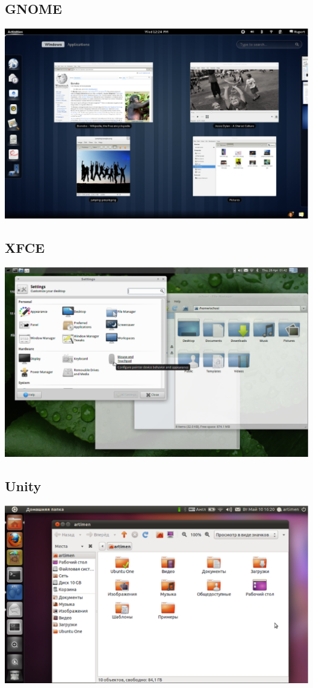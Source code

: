 \subsection{GNOME}
\includegraphics[scale=0.5]{base/Software/Gnome.eps}
\subsection{XFCE}
\includegraphics[scale=0.28]{base/Software/XFCE.eps}
\subsection{Unity}
\includegraphics[scale=0.35]{base/Software/Unity.eps}
